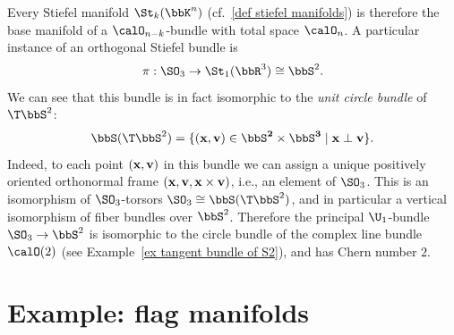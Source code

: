 \begin{example}\label{ex O2 Stiefel bundle}
    Every Stiefel manifold $\St_k(\bbK^n)$ (cf.\ \ref{def stiefel manifolds}) is therefore the base manifold of a $\calO_{n-k}$-bundle with total space $\calO_n$. A particular instance of an orthogonal Stiefel bundle is \[\pi:\SO_3\to \St_1(\bbR^3)\cong \bbS^2.\]
    We can see that this bundle is in fact isomorphic to the \emph{unit circle bundle} of $\T\bbS^2$:
    \[\bbS(\T\bbS^2)=\{(\bf{x},\bf{v})\in\bbS^2\times\bbS^3\mid \bf{x}\perp\bf{v}\}.\]
    Indeed, to each point $(\bf{x},\bf{v})$ in this bundle we can assign a unique positively oriented orthonormal frame $(\bf{x},\bf{v},\bf{x}\times\bf{v})$, i.e., an element of $\SO_3$. This is an isomorphism of $\SO_3$-torsors $\SO_3\cong \bbS(\T\bbS^2)$, and in particular a vertical isomorphism of fiber bundles over $\bbS^2$.  Therefore the principal $\U_1$-bundle $\SO_3\to \bbS^2$ is isomorphic to the circle bundle of the complex line bundle $\calO(2)$ (see Example~\ref{ex tangent bundle of S2}), and has Chern number $2$.
\end{example}





\section{Example: flag manifolds}\label{sec: flag manifolds}


